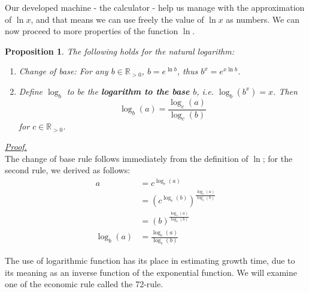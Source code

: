 \documentclass[12pt]{article}
\newtheorem*{proposition}{Proposition}
\renewenvironment{proof}[1][Proof]{\begin{snugshade*} \underline{\textit{{#1}.}}\\}{\hfill \qedsymbol \end{snugshade*}}
\begin{document}
    Our developed machine - the calculator - help us manage with the approximation of $\ln{x}$, and that means we can use freely the value of $\ln{x}$ as numbers. We can now proceed to more properties of the function $\ln$.

    \begin{proposition}
        The following holds for the natural logarithm:\begin{enumerate}
            \item Change of base: For any $b\in\mathbb{R}_{>0}$, $b=e^{\ln{b}}$, thus $b^x=e^{x\ln{b}}$.
            \item Define $\log_{b}$ to be the \textbf{logarithm to the base $b$}, i.e. $\log_{b}(b^x)=x$. Then \[\log_{b}(a)=\frac{\log_{c}(a)}{\log_{c}(b)}\] for $c\in\mathbb{R}_{>0}$.
        \end{enumerate}
    \end{proposition}

    \begin{proof}
        The change of base rule follows immediately from the definition of $\ln$; for the second rule, we derived as follows: \begin{align*}
            a&=c^{\log_{c}(a)}\\
            &=(c^{\log_{c}(b)})^{\frac{\log_{c}(a)}{\log_{c}(b)}}\\
            &=(b)^{\frac{\log_{c}(a)}{\log_{c}(b)}}\\
            \log_{b}(a)&=\frac{\log_{c}(a)}{\log_{c}(b)}
        \end{align*}
    \end{proof}

    The use of logarithmic function has its place in estimating growth time, due to its meaning as an inverse function of the exponential function. We will examine one of the economic rule called the 72-rule.
\end{document}
